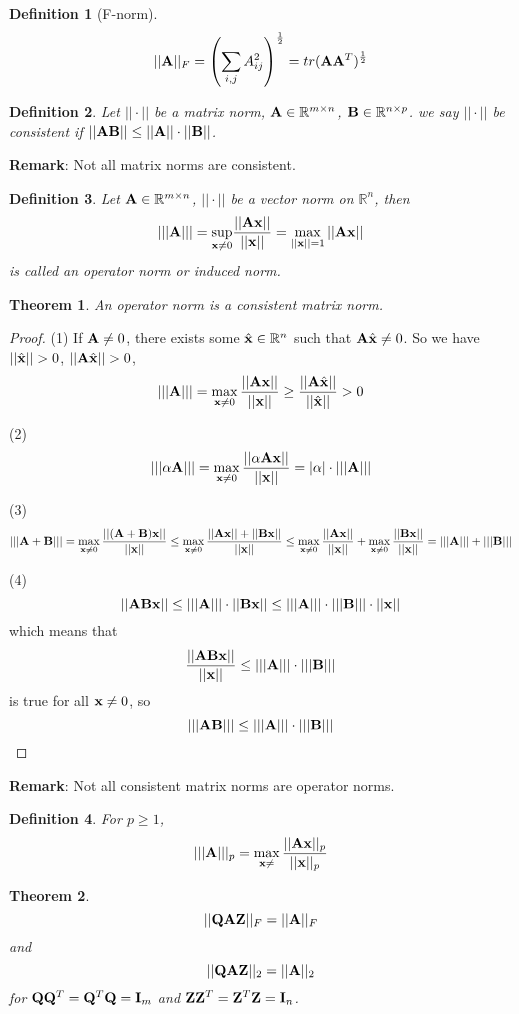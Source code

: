 \documentclass[11pt]{article}
\def\A{{\bf A}}
\def\B{{\bf B}}
\def\I{{\bf I}}
\def\Q{{\bf Q}}
\def\x{{\bf x}}
\def\Z{{\bf Z}}
\def\BR{{\mathbb R}}
\newtheorem{theorem}{Theorem}[section]
\newtheorem{definition}{Definition}[section]
\begin{document}
\begin{definition}
	[F-norm] $$||\A||_F=\left(\sum_{i,j}A_{ij}^2\right)^\frac{1}{2}=tr(\A\A^T)^\frac{1}{2}$$
\end{definition}

\begin{definition}
	Let $||\cdot||$ be a matrix norm, $\A\in\BR^{m\times n}$, $\B\in\BR^{n\times p}$. we say $||\cdot||$ be consistent if $||\A\B|| \le ||\A||\cdot||\B||$.
\end{definition}
{\bf Remark}: Not all matrix norms are consistent. 

\begin{definition}
	Let $\A\in\BR^{m\times n}$, $||\cdot||$ be a vector norm on $\BR^n$, then 
	$$|||\A|||=\underset{\x\ne 0} {\mathrm{sup}}\frac{||\A\x||}{||\x||}=\max_{||\x||=1}||\A\x||$$
	is called an operator norm or induced norm.
\end{definition}

\begin{theorem}
	An operator norm is a consistent matrix norm.
\end{theorem}
\begin{proof}
	(1) If $\A\ne 0$, there exists some $\hat{\x}\in \BR^n$ such that $\A\hat{\x}\ne 0$. So we have $||\hat{\x}||>0$, $||\A\hat{\x}||>0$,
	$$|||\A|||=\max_{\x\ne0}\frac{||\A\x||}{||\x||}\ge \frac{||\A\hat{\x}||}{||\hat{\x}||}> 0$$
	
	(2) $$|||\alpha\A|||=\max_{\x\ne0}\frac{||\alpha\A\x||}{||\x||}=|\alpha|\cdot|||\A|||$$
	
	(3) $$|||\A+\B|||=\max_{\x\ne0}\frac{||(\A+\B)\x||}{||\x||}\le \max_{\x\ne0}\frac{||\A\x||+||\B\x||}{||\x||} \le \max_{\x\ne0}\frac{||\A\x||}{||\x||} + \max_{\x\ne0}\frac{||\B\x||}{||\x||} = |||\A||| + |||\B|||$$ 
	
	(4) $$||\A\B\x|| \le |||\A|||\cdot||\B\x||\le |||\A|||\cdot|||\B|||\cdot||\x||$$
	which means that $$\frac{||\A\B\x||}{||\x||} \le |||\A|||\cdot |||\B|||$$ is true for all $\x\ne 0$, so 
	$$|||\A\B|||\le |||\A|||\cdot |||\B|||$$
\end{proof}
{\bf Remark}: Not all consistent matrix norms are operator norms. 

\begin{definition} For $p\ge 1$, 
	$$|||\A|||_p=\max_{\x\ne} \frac{||\A\x||_p}{||\x||_p}$$
\end{definition} 

\begin{theorem}
	$$||\Q\A\Z||_F=||\A||_F$$ and $$||\Q\A\Z||_2=||\A||_2$$ for $\Q\Q^T=\Q^T\Q=\I_m$ and $\Z\Z^T=\Z^T\Z=\I_n$.
\end{theorem}
\end{document}
